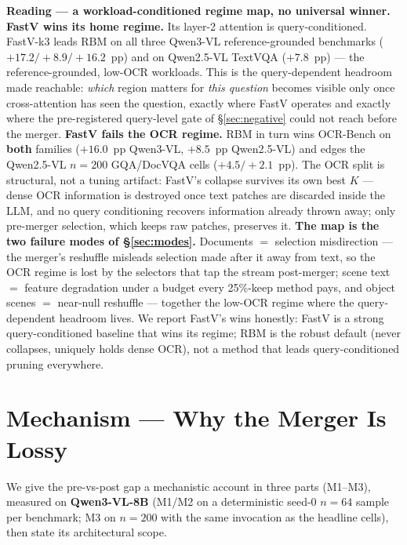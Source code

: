 \documentclass[sigconf,review,anonymous]{acmart}
\begin{document}
\textbf{Reading --- a workload-conditioned regime map, no universal winner.}
\textbf{FastV wins its home regime.} Its layer-2 attention is query-conditioned.
FastV-k3 leads RBM on all three Qwen3-VL reference-grounded benchmarks
($+17.2/+8.9/+16.2$~pp) and on Qwen2.5-VL TextVQA ($+7.8$~pp)
--- the reference-grounded, low-OCR workloads. This is the query-dependent
headroom made reachable: \emph{which} region matters for \emph{this question}
becomes visible only once cross-attention has seen the question, exactly where
FastV operates and exactly where the pre-registered query-level gate of
\S\ref{sec:negative} could not reach before the merger. \textbf{FastV fails the
OCR regime.} RBM in turn wins OCR-Bench on \textbf{both} families ($+16.0$~pp
Qwen3-VL, $+8.5$~pp Qwen2.5-VL) and edges the Qwen2.5-VL $n = 200$ GQA/DocVQA
cells ($+4.5 / +2.1$~pp). The OCR split is structural, not a tuning artifact:
FastV's collapse survives its own best $K$ --- dense OCR information is
destroyed once text patches are discarded inside the LLM, and no query
conditioning recovers information already thrown away; only pre-merger
selection, which keeps raw patches, preserves it. \textbf{The map is the two
failure modes of \S\ref{sec:modes}.} Documents $=$ selection misdirection ---
the merger's reshuffle misleads selection made after it away from text, so the
OCR regime is lost by the selectors that tap the stream post-merger; scene text
$=$ feature degradation under a budget every 25\%-keep method pays, and object
scenes $=$ near-null reshuffle --- together the low-OCR regime where the
query-dependent headroom lives. We report FastV's wins honestly: FastV is a
strong query-conditioned baseline that wins its regime; RBM is the robust
default (never collapses, uniquely holds dense OCR), not a method that leads
query-conditioned pruning everywhere.

\section{Mechanism --- Why the Merger Is Lossy}\label{sec:mechanism}

We give the pre-vs-post gap a mechanistic account in three parts (M1--M3),
measured on \textbf{Qwen3-VL-8B} (M1/M2 on a deterministic seed-0 $n = 64$ sample
per benchmark; M3 on $n = 200$ with the same invocation as the headline cells),
then state its architectural scope.
\end{document}
